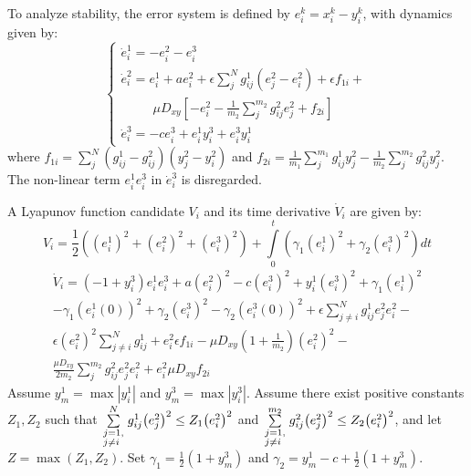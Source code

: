 \documentclass[10pt]{article}
\begin{document}
To analyze stability, the error system is defined by $e_i^k = x_i^k - y_i^k$, with dynamics given by:
$$
\left\{ \begin{array}{l}
\dot e_i^1 =  - e_i^2 - e_i^3\\
\dot e_i^2 = e_i^1 + ae_i^2 + \epsilon \sum\limits_j^N {{g_{ij}^1\left( {e_j^2 - e_i^2} \right) }} + \epsilon {f_{1i}} + \\
\,\,\,\,\,\,\,\,\,\,\,\,\,\,\,\mu {D_{xy}}\left[ { - e_i^2 - \frac{1}{{{m_2}}}\sum\limits_j^{{m_2}} {g _{ij}^2e_j^2}  + {f_{2i}}} \right]\\
\dot e_i^3 =  - ce_i^3 + e_i^1y_i^3 + e_i^3y_i^1
\end{array} \right.
$$
where ${f_{1i}} = \sum\limits_j^{{N}} {\left( {g_{ij}^1 - g_{ij}^2} \right)\left( {y_j^2 - y_i^2} \right)}$ and ${f_{2i}} = \frac{1}{{{m_1}}}\sum\limits_j^{{m_1}} {g _{ij}^1y_j^2}  - \frac{1}{{{m_2}}}\sum\limits_j^{{m_2}} {g _{ij}^2y_j^2}$. The non-linear term $e_i^1 e_i^3$ in $\dot e_i^3$ is disregarded.

A Lyapunov function candidate $V_i$ and its time derivative $\dot{V}_i$ are given by:
$$
{V_i} = \frac{1}{2}\left( {{{\left( {e_i^1} \right)}^2} + {{\left( {e_i^2} \right)}^2} + {{\left( {e_i^3} \right)}^2}} \right) + \int\limits_0^t {\left( {{\gamma _1}{{\left( {e_i^1} \right)}^2} + {\gamma _2}{{\left( {e_i^3} \right)}^2}} \right)dt}
$$
$$
\begin{array}{l}
{{\dot V}_i} = \left( {-1 + y_i^3} \right)e_i^1e_i^3 + a{\left( {e_i^2} \right)^2} - c{\left( {e_i^3} \right)^2} + y_i^1{\left( {e_i^3} \right)^2} + {\gamma _1}{\left( {e_i^1} \right)^2}\\
 - {\gamma _1}{\left( {e_i^1\left( 0 \right)} \right)^2} + {\gamma _2}{\left( {e_i^3} \right)^2} - {\gamma _2}{\left( {e_i^3\left( 0 \right)} \right)^2} + \epsilon \sum\limits_{j \ne i}^N {g_{ij}^1e_j^2e_i^2}  - \\
\epsilon {\left( {e_i^2} \right)^2}\sum\limits_{j \ne i}^N {g_{ij}^1}  + e_i^2\epsilon {{f_{1i}}}  - \mu {D_{xy}}\left( {1 + \frac{1}{{{m_2}}}} \right){\left( {e_i^2} \right)^2} - \\
\frac{{\mu {D_{xy}}}}{{2{m_2}}}\sum\limits_j^{{m_2}} {g _{ij}^2e_j^2e_i^2}  + e_i^2\mu {D_{xy}}{f_{2i}}
\end{array}
$$
Assume $y_m^1 = \max\left| {y_i^1} \right|$ and $y_m^3 = \max\left| {y_i^3} \right|$. Assume there exist positive constants $Z_1, Z_2$ such that $\sum\limits_{\scriptstyle j = 1,\hfill\atop \scriptstyle j \ne i\hfill}^N {g_{ij}^1{{\left( {e_j^2} \right)}^2}} \le {Z_1}{\left( {e_i^2} \right)^2}$ and $\sum\limits_{\scriptstyle j = 1,\hfill\atop \scriptstyle j \ne i\hfill}^{{m_2}} {g _{ij}^2{{\left( {e_j^2} \right)}^2}} \le {Z_2}{\left( {e_i^2} \right)^2}$, and let $Z = \max\left( {Z_1, Z_2} \right)$. Set ${\gamma _1} = \frac{1}{2}\left( {1 + y_m^3} \right)$ and ${\gamma _2} = y_m^1 - c + \frac{1}{2}\left( {1 + y_m^3} \right)$.
\end{document}
